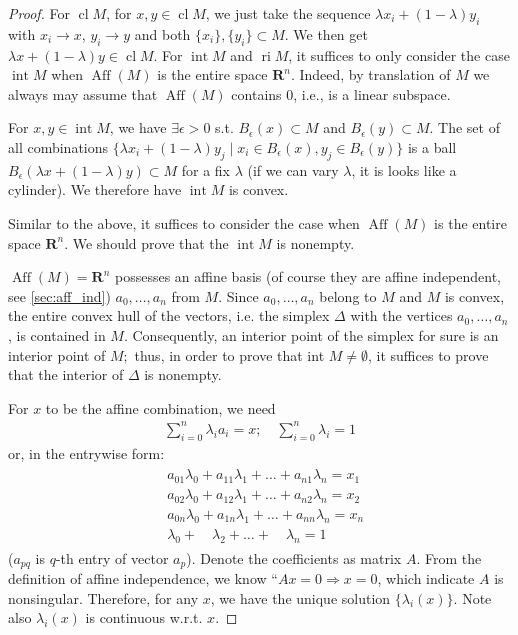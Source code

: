 \documentclass{article}
\newcommand{\cl}{\operatorname{cl}}
\newcommand{\ri}{\operatorname{ri}}
\newcommand{\inte}{\operatorname{int}}
\newcommand{\Aff}{\operatorname{Aff}}
\begin{document}
\begin{proof}\color{ForestGreen}
 For $\cl M$, for $x,y\in \cl M$, we just take the sequence $\lambda x_i+(1-\lambda) y_i$ with $x_i\rightarrow x$, $y_i\rightarrow y$ and both $\{x_i\},\{y_i\}\subset M$. We then get $\lambda x+(1-\lambda) y \in \cl M$. 
For $\inte M$ and $\ri M$, it suffices to only consider the case $\inte M$ when $\Aff(M)$ is the entire space $\mathbf{R}^n$. Indeed, by translation of $M$ we always may assume that  $\Aff(M)$ contains $0$, i.e., is a linear subspace. 

For $x,y\in \inte M$, we have $\exists \epsilon>0$ s.t. $B_{\epsilon}(x)\subset M$ and $B_{\epsilon}(y)\subset M$. The set of all combinations $\{\lambda x_i +(1-\lambda) y_j\mid x_i\in B_{\epsilon}(x),y_j\in B_{\epsilon}(y)\}$ is a ball $B_{\epsilon}(\lambda x +(1-\lambda) y)\subset M$ for a fix $\lambda$ (if we can vary $\lambda$, it is looks like a cylinder). We therefore have $\inte M$ is convex.

 Similar to the above, it suffices to consider the case when  $\Aff(M)$ is the entire space $\mathbf{R}^{n}$.  We should prove that the  $\inte M$ is nonempty.

$\Aff(M)=\mathbf{R}^{n}$ possesses an affine basis (of course they are affine independent, see \cref{sec:aff_ind}) $a_{0}, \ldots, a_{n}$ from $M$. Since $a_{0}, \ldots, a_{n}$ belong to $M$ and $M$ is convex, the entire convex hull of the vectors, i.e. the simplex $\Delta$ with the vertices $a_{0}, \ldots, a_{n}$, is contained in $M$. Consequently, an interior point of the simplex for sure is an interior point of $M ;$ thus, in order to prove that int $M \neq \emptyset$, it suffices to prove that the interior of $\Delta$ is nonempty.

For $x$ to be the affine combination, we need
\begin{align*}
\sum_{i=0}^{n} \lambda_{i} a_{i}=x ; \quad \sum_{i=0}^{n} \lambda_{i}=1
\end{align*}
or, in the entrywise form:
\begin{align*}
\begin{aligned}
&a_{01} \lambda_{0}+a_{11} \lambda_{1}+\ldots+a_{n 1} \lambda_{n}=x_{1}\\
&a_{02} \lambda_{0}+a_{12} \lambda_{1}+\ldots+a_{n 2} \lambda_{n}=x_{2}\\
&a_{0 n} \lambda_{0}+a_{1 n} \lambda_{1}+\ldots+a_{n n} \lambda_{n}=x_{n}\\
&\lambda_{0}+\quad \lambda_{2}+\ldots+\quad \lambda_{n}=1
\end{aligned}
\end{align*}
($a_{p q}$ is $q$-th entry of vector $a_{p}$). Denote the coefficients as matrix $A$. From the definition of affine independence, we know ``$Ax=0\Rightarrow x=0$, which indicate $A$ is nonsingular. Therefore, for any $x$, we have the unique solution $\{\lambda_i(x)\}$. Note also $\lambda_i(x)$ is continuous w.r.t. $x$.


\end{proof}
\end{document}
